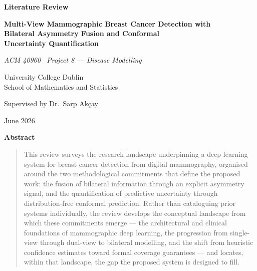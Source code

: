 \documentclass[12pt, a4paper]{article}
\renewenvironment{abstract}{%
  \begin{center}\textbf{Abstract}\end{center}%
  \begin{quotation}%
}{\end{quotation}}
\begin{document}
\begin{titlepage}
  \centering
  \vspace*{3cm}

  {\LARGE\bfseries Literature Review\par}
  \vspace{1.2cm}

  {\large\bfseries
    Multi-View Mammographic Breast Cancer Detection with\\
    Bilateral Asymmetry Fusion and Conformal\\
    Uncertainty Quantification\par}
  \vspace{1.8cm}

  {\normalsize\itshape ACM 40960 \textperiodcentered\ Project 8 --- Disease Modelling\par}
  \vspace{0.6cm}

  {\normalsize University College Dublin\\
  School of Mathematics and Statistics\par}
  \vspace{0.6cm}

  {\normalsize Supervised by Dr.\ Sarp Ak{\c{c}}ay\par}
  \vspace{0.6cm}

  {\normalsize June 2026\par}
\end{titlepage}

\begin{abstract}
This review surveys the research landscape underpinning a deep learning
system for breast cancer detection from digital mammography, organised
around the two methodological commitments that define the proposed work:
the fusion of bilateral information through an explicit asymmetry signal,
and the quantification of predictive uncertainty through distribution-free
conformal prediction. Rather than cataloguing prior systems individually,
the review develops the conceptual landscape from which these commitments
emerge --- the architectural and clinical foundations of mammographic deep
learning, the progression from single-view through dual-view to bilateral
modelling, and the shift from heuristic confidence estimates toward formal
coverage guarantees --- and locates, within that landscape, the gap the
proposed system is designed to fill.
\end{abstract}
\end{document}
